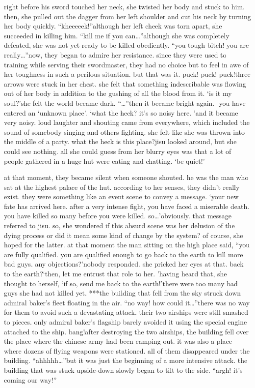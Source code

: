 right before his sword touched her neck, she twisted her body and stuck to him.
then, she pulled out the dagger from her left shoulder and cut his neck by turning her body quickly.
“kheeeeek!”although her left cheek was torn apart, she succeeded in killing him.
“kill me if you can…”although she was completely defeated, she was not yet ready to be killed obediently.
“you tough bitch! you are really…”now, they began to admire her resistance.
 since they were used to training while serving their swordmaster, they had no choice but to feel in awe of her toughness in such a perilous situation.
but that was it.
puck! puck! puck!three arrows were stuck in her chest.
she felt that something indescribable was flowing out of her body in addition to the gushing of all the blood from it.
‘is it my soul?’she felt the world became dark.
“…”then it became bright again.
-you have entered an ‘unknown place’.
‘what the heck? it’s so noisy here.
’and it became very noisy.
 loud laughter and shouting came from everywhere, which included the sound of somebody singing and others fighting.
 she felt like she was thrown into the middle of a party.
what the heck is this place?jisu looked around, but she could see nothing.
 all she could guess from her blurry eyes was that a lot of people gathered in a huge hut were eating and chatting.
‘be quiet!’

at that moment, they became silent when someone shouted.
 he was the man who sat at the highest palace of the hut.
 according to her senses, they didn’t really exist.
 they were something like an event scene to convey a message.
‘your new fate has arrived here.
 after a very intense fight, you have faced a miserable death.
 you have killed so many before you were killed.
 so…’obviously.
 that message referred to jisu.
so, she wondered if this absurd scene was her delusion of the dying process or did it mean some kind of change by the system? of course, she hoped for the latter.
at that moment the man sitting on the high place said, “you are fully qualified.
 you are qualified enough to go back to the earth to kill more bad guys.
 any objections?’nobody responded.
 she pricked her eyes at that.
 back to the earth?‘then, let me entrust that role to her.
’having heard that, she thought to herself, ‘if so, send me back to the earth!’there were too many bad guys she had not killed yet.
***the building that fell from the sky struck down admiral baker’s fleet floating in the air.
“no way! how could it…”there was no way for them to avoid such a devastating attack.
 their two airships were still smashed to pieces.
 only admiral baker’s flagship barely avoided it using the special engine attached to the ship.
bang!after destroying the two airships, the building fell over the place where the chinese army had been camping out.
 it was also a place where dozens of flying weapons were stationed.
 all of them disappeared under the building.
“ahhhhh…”but it was just the beginning of a more intensive attack.
the building that was stuck upside-down slowly began to tilt to the side.
“argh! it’s coming our way!”

 